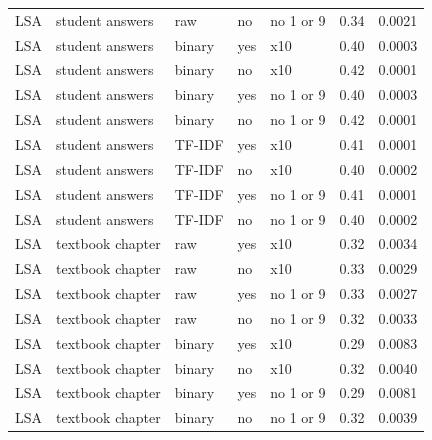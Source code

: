 \documentclass[a4paper,10pt,twoside]{article}
\begin{document}
\begin{table}[]
\begin{tabular}{lllllll}
		LSA        & student answers    & raw             & no                  & no 1 or 9         & 0.34 & 0.0021       \\
		LSA        & student answers    & binary          & yes                 & x10               & 0.40 & 0.0003       \\
		LSA        & student answers    & binary          & no                  & x10               & 0.42 & 0.0001       \\
		LSA        & student answers    & binary          & yes                 & no 1 or 9         & 0.40 & 0.0003       \\
		LSA        & student answers    & binary          & no                  & no 1 or 9         & 0.42 & 0.0001       \\
		LSA        & student answers    & TF-IDF          & yes                 & x10               & 0.41 & 0.0001       \\
		LSA        & student answers    & TF-IDF          & no                  & x10               & 0.40 & 0.0002       \\
		LSA        & student answers    & TF-IDF          & yes                 & no 1 or 9         & 0.41 & 0.0001       \\
		LSA        & student answers    & TF-IDF          & no                  & no 1 or 9         & 0.40 & 0.0002       \\
		LSA        & textbook chapter   & raw             & yes                 & x10               & 0.32 & 0.0034       \\
		LSA        & textbook chapter   & raw             & no                  & x10               & 0.33 & 0.0029       \\
		LSA        & textbook chapter   & raw             & yes                 & no 1 or 9         & 0.33 & 0.0027       \\
		LSA        & textbook chapter   & raw             & no                  & no 1 or 9         & 0.32 & 0.0033       \\
		LSA        & textbook chapter   & binary          & yes                 & x10               & 0.29 & 0.0083       \\
		LSA        & textbook chapter   & binary          & no                  & x10               & 0.32 & 0.0040       \\
		LSA        & textbook chapter   & binary          & yes                 & no 1 or 9         & 0.29 & 0.0081       \\
		LSA        & textbook chapter   & binary          & no                  & no 1 or 9         & 0.32 & 0.0039      
	\end{tabular}
\end{table}
\end{document}
